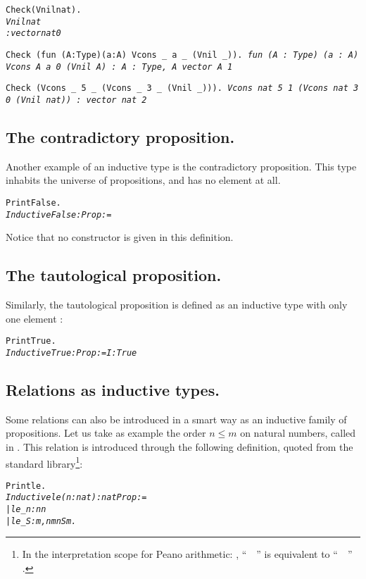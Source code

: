\documentclass[11pt]{article}
\begin{document}
\begin{alltt}
Check (Vnil nat).
\it Vnil nat
     : vector nat 0

\tt Check (fun (A:Type)(a:A){\funarrow} Vcons _ a _ (Vnil _)).
\it fun (A : Type) (a : A) {\funarrow} Vcons A a 0 (Vnil A)
     : {\prodsym} A : Type, A {\arrow} vector A 1


\tt Check (Vcons _ 5 _ (Vcons _ 3 _ (Vnil _))).
\it Vcons nat 5 1 (Vcons nat 3 0 (Vnil nat))
     : vector nat 2
\end{alltt}

\subsection{The contradictory proposition.}
Another example of an inductive type is the contradictory proposition.
This type inhabits the universe of propositions, and has no element
at all.
\begin{alltt}
Print False.
\it{} Inductive False : Prop :=
\end{alltt}

\noindent Notice that no constructor is given in this definition.

\subsection{The tautological proposition.}
Similarly, the
tautological proposition {\True} is defined as an inductive type
with only one element {\I}:

\begin{alltt}
Print True.
\it{}Inductive True : Prop :=  I : True
\end{alltt}

\subsection{Relations as inductive types.}
Some relations can also be introduced in a smart way as an inductive family
of propositions. Let us take as example the order $n \leq m$ on natural
numbers, called  in {\coq}.
 This relation is introduced through
the following definition, quoted from the standard library\footnote{In the interpretation scope
for Peano arithmetic:
,  ``~~'' is equivalent to
``~~'' .}:




\begin{alltt}
Print le. \it
Inductive le (n:nat) : nat\arrow{}Prop :=
|  le_n: n {\coqle} n
|  le_S: {\prodsym} m, n {\coqle} m \arrow{} n {\coqle} S m.
\end{alltt}
\end{document}
